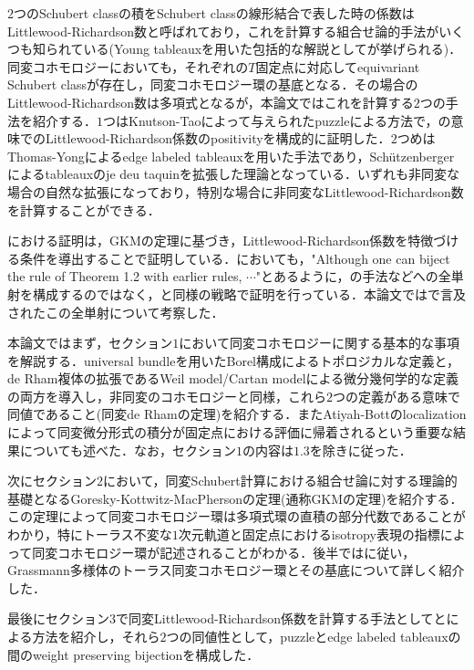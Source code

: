 $2$つのSchubert classの積をSchubert classの線形結合で表した時の係数はLittlewood-Richardson数と呼ばれており，これを計算する組合せ論的手法がいくつも知られている(Young tableauxを用いた包括的な解説として\cite{fulton young tableaux}が挙げられる)．同変コホモロジーにおいても，それぞれの$T$固定点に対応してequivariant Schubert classが存在し，同変コホモロジー環の基底となる．その場合のLittlewood-Richardson数は多項式となるが，本論文ではこれを計算する$2$つの手法を紹介する．$1$つはKnutson-Tao\cite{knutson tao}によって与えられたpuzzleによる方法で，\cite{positivity}の意味でのLittlewood-Richardson係数のpositivityを構成的に証明した．$2$つめはThomas-Yong\cite{thomas yong}によるedge labeled tableauxを用いた手法であり，Schützenberger\cite{schutzenberger}によるtableauxのje deu taquinを拡張した理論となっている．いずれも非同変な場合の自然な拡張になっており，特別な場合に非同変なLittlewood-Richardson数を計算することができる．

\cite{knutson tao}における証明は，GKMの定理に基づき，Littlewood-Richardson係数を特徴づける条件を導出することで証明している．\cite{thomas yong}においても，"Although one can biject the rule of Theorem 1.2
with earlier rules, $\cdots$"とあるように，\cite{knutson tao}の手法などへの全単射を構成するのではなく，\cite{knutson tao}と同様の戦略で証明を行っている．本論文では\cite{thomas yong}で言及されたこの全単射について考察した．

本論文ではまず，セクション$1$において同変コホモロジーに関する基本的な事項を解説する．universal bundleを用いたBorel構成によるトポロジカルな定義と，de Rham複体の拡張であるWeil model/Cartan modelによる微分幾何学的な定義の両方を導入し，非同変のコホモロジーと同様，これら$2$つの定義がある意味で同値であること(同変de Rhamの定理)を紹介する．またAtiyah-Bottのlocalizationによって同変微分形式の積分が固定点における評価に帰着されるという重要な結果についても述べた．なお，セクション$1$の内容は$1.3$を除き\cite{tu equivariant}に従った．

次にセクション$2$において，同変Schubert計算における組合せ論に対する理論的基礎となるGoresky-Kottwitz-MacPhersonの定理(通称GKMの定理)を紹介する．この定理によって同変コホモロジー環は多項式環の直積の部分代数であることがわかり，特にトーラス不変な$1$次元軌道と固定点におけるisotropy表現の指標によって同変コホモロジー環が記述されることがわかる．後半では\cite{knutson tao}に従い，Grassmann多様体のトーラス同変コホモロジー環とその基底について詳しく紹介した．

最後にセクション$3$で同変Littlewood-Richardson係数を計算する手法として\cite{knutson tao}と\cite{thomas yong}による方法を紹介し，それら$2$つの同値性として，puzzleとedge labeled tableauxの間のweight preserving bijectionを構成した．